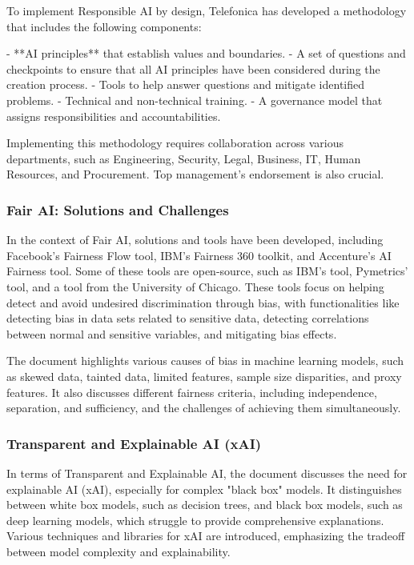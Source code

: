 \documentclass{article}
\begin{document}
To implement Responsible AI by design, Telefonica has developed a methodology that includes the following components:

- **AI principles** that establish values and boundaries.
- A set of questions and checkpoints to ensure that all AI principles have been considered during the creation process.
- Tools to help answer questions and mitigate identified problems.
- Technical and non-technical training.
- A governance model that assigns responsibilities and accountabilities.

Implementing this methodology requires collaboration across various departments, such as Engineering, Security, Legal, Business, IT, Human Resources, and Procurement. Top management's endorsement is also crucial.

\subsubsection{Fair AI: Solutions and Challenges}
In the context of Fair AI, solutions and tools have been developed, including Facebook's Fairness Flow tool, IBM's Fairness 360 toolkit, and Accenture's AI Fairness tool. Some of these tools are open-source, such as IBM's tool, Pymetrics' tool, and a tool from the University of Chicago. These tools focus on helping detect and avoid undesired discrimination through bias, with functionalities like detecting bias in data sets related to sensitive data, detecting correlations between normal and sensitive variables, and mitigating bias effects.

The document highlights various causes of bias in machine learning models, such as skewed data, tainted data, limited features, sample size disparities, and proxy features. It also discusses different fairness criteria, including independence, separation, and sufficiency, and the challenges of achieving them simultaneously.

\subsubsection{Transparent and Explainable AI (xAI)}
In terms of Transparent and Explainable AI, the document discusses the need for explainable AI (xAI), especially for complex "black box" models. It distinguishes between white box models, such as decision trees, and black box models, such as deep learning models, which struggle to provide comprehensive explanations. Various techniques and libraries for xAI are introduced, emphasizing the tradeoff between model complexity and explainability.
\end{document}

